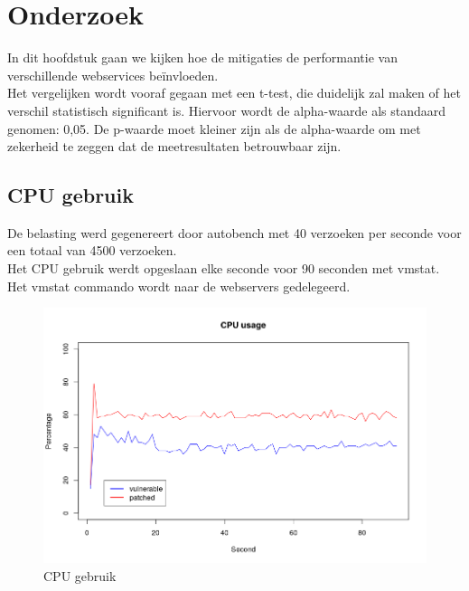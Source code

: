 \chapter{Onderzoek}
In dit hoofdstuk gaan we kijken hoe de mitigaties de performantie van verschillende webservices beïnvloeden.\\
Het vergelijken wordt vooraf gegaan met een t-test, die duidelijk zal maken of het verschil statistisch significant is. Hiervoor wordt de alpha-waarde als standaard genomen: 0,05. De p-waarde moet kleiner zijn als de alpha-waarde om met zekerheid te zeggen dat de meetresultaten betrouwbaar zijn.

\section{CPU gebruik}
De belasting werd gegenereert door autobench met 40 verzoeken per seconde voor een totaal van 4500 verzoeken.\\
Het CPU gebruik werdt opgeslaan elke seconde voor 90 seconden met vmstat.\\
Het vmstat commando wordt naar de webservers gedelegeerd.


\begin{figure}
	\includegraphics[width=1.0\linewidth]{img/cpu_usage.png}
	\caption{CPU gebruik}
	\label{fig:cpu_usage}
\end{figure}

